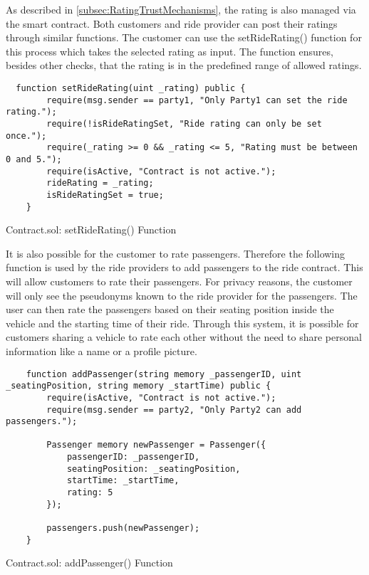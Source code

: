 As described in \ref{subsec:RatingTrustMechanisms}, the rating is also managed via the smart contract. Both customers and ride provider can post their ratings through similar functions. The customer can use the setRideRating() function for this process which takes the selected rating as input.
The function ensures, besides other checks, that the rating is in the predefined range of allowed ratings. 

\lstset{
  basicstyle=\footnotesize\ttfamily,
  breaklines=true,
  numbers=left,
  firstnumber=222
}
\begin{Listing}
\begin{lstlisting}
  function setRideRating(uint _rating) public {
        require(msg.sender == party1, "Only Party1 can set the ride rating.");
        require(!isRideRatingSet, "Ride rating can only be set once.");
        require(_rating >= 0 && _rating <= 5, "Rating must be between 0 and 5.");
        require(isActive, "Contract is not active.");
        rideRating = _rating;
        isRideRatingSet = true;
    }
\end{lstlisting}
  \caption{Contract.sol: setRideRating() Function}
  \label{lst:setRideRating}
\end{Listing}

It is also possible for the customer to rate passengers. Therefore the following function is used by the ride providers to add passengers to the ride contract. This will allow customers to rate their passengers. For privacy reasons, the customer will only see the pseudonyms known to the ride provider for the passengers. The user can then rate the passengers based on their seating position inside the vehicle and the starting time of their ride. Through this system, it is possible for customers sharing a vehicle to rate each other without the need to share personal information like a name or a profile picture. 

\lstset{
  basicstyle=\footnotesize\ttfamily,
  breaklines=true,
  numbers=left,
  firstnumber=53
}

\begin{Listing}
\begin{lstlisting}
    function addPassenger(string memory _passengerID, uint _seatingPosition, string memory _startTime) public {
        require(isActive, "Contract is not active.");
        require(msg.sender == party2, "Only Party2 can add passengers.");

        Passenger memory newPassenger = Passenger({
            passengerID: _passengerID,
            seatingPosition: _seatingPosition,
            startTime: _startTime,
            rating: 5
        });

        passengers.push(newPassenger);
    }
\end{lstlisting}
  \caption{Contract.sol: addPassenger() Function}
  \label{lst:setUserCanceldRide}
\end{Listing}


